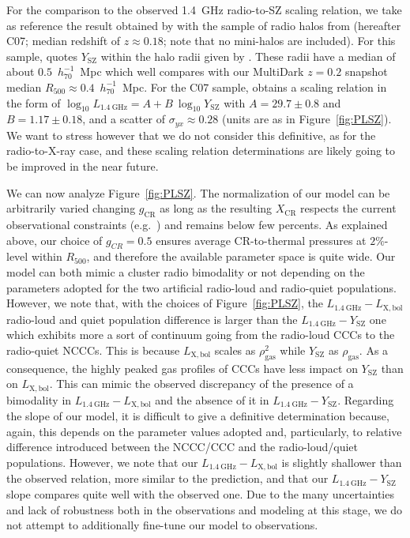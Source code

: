\documentclass[traditabstract]{aa}
\newcommand{\rmn}{\mathrm}
\begin{document}
For the comparison to the observed 1.4~GHz radio-to-SZ scaling relation, we take as reference the result obtained by \cite{2012MNRAS.421L.112B} with the sample of radio halos from \cite{2007MNRAS.378.1565C} (hereafter C07; median redshift of $z \approx 0.18$; note that no mini-halos are included). For this sample, \cite{2012MNRAS.421L.112B} quotes $Y_{\rmn{SZ}}$ within the halo radii given by \cite{2007MNRAS.378.1565C}. These radii have a median of about $0.5$~$h_{70}^{-1}$~Mpc which well compares with our MultiDark $z = 0.2$ snapshot median $R_{500} \approx 0.4$~$h_{70}^{-1}$~Mpc. For the C07 sample, \cite{2012MNRAS.421L.112B} obtains a scaling relation in the form of  $\log_{10} L_{1.4~\rmn{GHz}} = A + B~\log_{10} Y_{\rmn{SZ}}$ with $A=29.7\pm0.8$ and $B=1.17\pm0.18$, and a scatter of $\sigma_{yx} \approx 0.28$ (units are as in Figure~\ref{fig:PLSZ}). We want to stress however that we do not consider this definitive, as for the radio-to-X-ray case, and these scaling relation determinations are likely going to be improved in the near future. 

We can now analyze Figure~\ref{fig:PLSZ}. The normalization of our model can be arbitrarily varied changing $g_{\rmn{CR}}$ as long as the resulting $X_{\rmn{CR}}$ respects the current observational constraints (e.g.~\citealp{2011arXiv1111.5544M}) and remains below few percents. As explained above, our choice of $g_{CR}=0.5$ ensures average CR-to-thermal pressures at $2\%$-level within $R_{500}$, and therefore the available parameter space is quite wide. Our model can both mimic a cluster radio bimodality or not depending on the parameters adopted for the two artificial radio-loud and radio-quiet populations. However, we note that, with the choices of Figure~\ref{fig:PLSZ}, the $L_{1.4~\rmn{GHz}}-L_{\rmn{X,bol}}$ radio-loud and quiet population difference is larger than the $L_{1.4~\rmn{GHz}}-Y_{\rmn{SZ}}$ one which exhibits more a sort of continuum going from the radio-loud CCCs to the radio-quiet NCCCs. This is because $L_{\rmn{X,bol}}$ scales as $\rho_{\rmn{gas}}^2$ while $Y_{\rmn{SZ}}$ as $\rho_{\rmn{gas}}$. As a consequence, the highly peaked gas profiles of CCCs have less impact on $Y_{\rmn{SZ}}$ than on  $L_{\rmn{X,bol}}$. This can mimic the observed discrepancy of the presence of a bimodality in $L_{1.4~\rmn{GHz}}-L_{\rmn{X,bol}}$ and the absence of it in $L_{1.4~\rmn{GHz}}-Y_{\rmn{SZ}}$. Regarding the slope of our model, it is difficult to give a definitive determination because, again, this depends on the parameter values adopted and, particularly, to relative difference introduced between the NCCC/CCC and the radio-loud/quiet populations. However, we note that our $L_{1.4~\rmn{GHz}}-L_{\rmn{X,bol}}$ is slightly shallower than the observed relation, more similar to the \cite{2009JCAP...09..024K} prediction, and that our $L_{1.4~\rmn{GHz}}-Y_{\rmn{SZ}}$ slope compares quite well with the observed one. Due to the many uncertainties and lack of robustness both in the observations and modeling at this stage, we do not attempt to additionally fine-tune our model to observations. 
\end{document}
